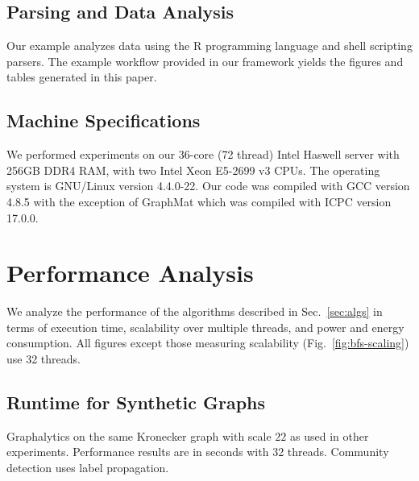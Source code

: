\documentclass[conference]{IEEEtran}
\begin{document}
\subsection{Parsing and Data Analysis}
Our example analyzes data using the R programming language and shell scripting parsers. The example workflow provided in our framework yields the figures and tables generated in this paper.

\subsection{Machine Specifications}
We performed experiments on our 36-core (72 thread) Intel Haswell server with 256GB DDR4 RAM, with two Intel Xeon E5-2699 v3 CPUs. The operating system is GNU/Linux version 4.4.0-22. Our code was compiled with GCC version 4.8.5 with the exception of GraphMat which was compiled with ICPC version 17.0.0.

\section{Performance Analysis}\label{sec:perf}

We analyze the performance of the algorithms described in Sec.~\ref{sec:algs} in terms of execution time, scalability over multiple threads, and power and energy consumption. All figures except those measuring scalability (Fig.~\ref{fig:bfs-scaling}) use 32 threads.

\subsection{Runtime for Synthetic Graphs}

\begin{table}
	\caption{Graphalytics on the same Kronecker graph with scale $22$ as used in other experiments. Performance results are in seconds with 32 threads. Community detection uses label propagation.}
	\centering
	\label{tab:graphalytics}
\end{table}
\end{document}
